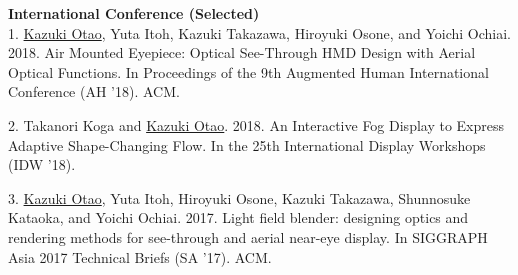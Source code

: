 \documentclass[margin]{res}
\begin{document}
\begin{resume}
{\bf International Conference (Selected)} \\
1. \underline{Kazuki Otao}, Yuta Itoh, Kazuki Takazawa, Hiroyuki Osone, and Yoichi Ochiai. 2018. Air Mounted Eyepiece: Optical See-Through HMD Design with Aerial Optical Functions. In Proceedings of the 9th Augmented Human International Conference (AH ’18). ACM.

2. Takanori Koga and \underline{Kazuki Otao}. 2018. An Interactive Fog Display to Express Adaptive Shape-Changing Flow. In the 25th International Display Workshops (IDW '18).

3. \underline{Kazuki Otao}, Yuta Itoh, Hiroyuki Osone, Kazuki Takazawa, Shunnosuke Kataoka, and Yoichi Ochiai. 2017. Light field blender: designing optics and rendering methods for see-through and aerial near-eye display. In SIGGRAPH Asia 2017 Technical Briefs (SA '17). ACM.





\end{resume}
\end{document}
